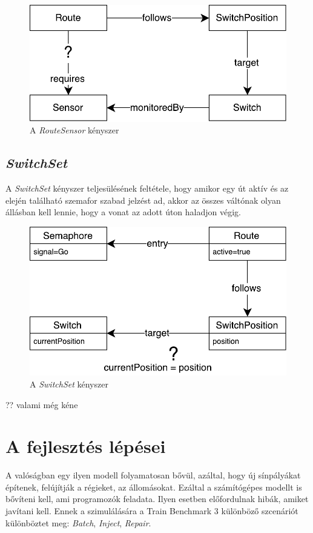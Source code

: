 \begin{figure}[!ht]
	\centering
	\includegraphics[width=0.7\linewidth, keepaspectratio]{figures/RouteSensor.pdf}
	\caption{A \emph{RouteSensor} kényszer}
	\label{fig:RouteSensor}
\end{figure}

\subsection{\emph{SwitchSet}}

A \emph{SwitchSet} kényszer teljesülésének feltétele, hogy amikor egy út aktív és az elején található szemafor szabad jelzést ad, akkor az összes váltónak olyan állásban kell lennie, hogy a vonat az adott úton haladjon végig.

\begin{figure}[!ht]
	\centering
	\includegraphics[width=0.7\linewidth, keepaspectratio]{figures/SwitchSet.pdf}
	\caption{A \emph{SwitchSet} kényszer}
	\label{fig:SwitchSet}
\end{figure}

?? valami még kéne

\section{A fejlesztés lépései}

A valóságban egy ilyen modell folyamatosan bővül, azáltal, hogy új sínpályákat építenek, felújítják a régieket, az állomásokat. Ezáltal a számítógépes modellt is bővíteni kell, ami programozók feladata. Ilyen esetben előfordulnak hibák, amiket javítani kell. Ennek a szimulálására a Train Benchmark 3 különböző szcenáriót különböztet meg: \emph{Batch}, \emph{Inject}, \emph{Repair}.

